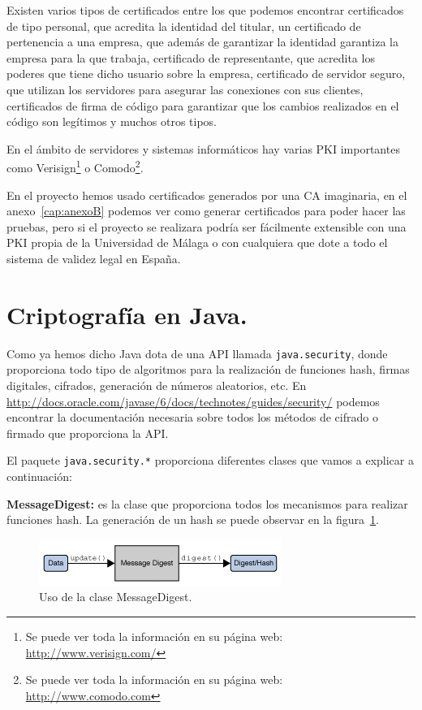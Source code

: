 Existen varios tipos de certificados entre los que podemos encontrar certificados de tipo personal, que acredita la identidad del titular, un certificado de pertenencia a una empresa, que además de garantizar la identidad garantiza la empresa para la que trabaja, certificado de representante, que acredita los poderes que tiene dicho usuario sobre la empresa, certificado de servidor seguro, que utilizan los servidores para asegurar las conexiones con sus clientes, certificados de firma de código para garantizar que los cambios realizados en el código son legítimos y muchos otros tipos.

En el ámbito de servidores y sistemas informáticos hay varias PKI importantes como Verisign\footnote{ Se puede ver toda la información en su página web: \url{http://www.verisign.com/}} o Comodo\footnote{ Se puede ver toda la información en su página web: \url{http://www.comodo.com}}.  


En el proyecto hemos usado certificados generados por una CA imaginaria, en el anexo~\ref{cap:anexoB} podemos ver como generar certificados para poder hacer las pruebas, pero si el proyecto se realizara podría ser fácilmente extensible con una PKI propia de la Universidad de Málaga o con cualquiera que dote a todo el sistema de validez legal en España.

\section{Criptografía en Java.}\label{cap:javasecurity}

Como ya hemos dicho Java dota de una API llamada \lstinline{java.security}, donde proporciona todo tipo de algoritmos para la realización de funciones hash, firmas digitales, cifrados, generación de números aleatorios, etc. En \url{http://docs.oracle.com/javase/6/docs/technotes/guides/security/} podemos encontrar la documentación necesaria sobre todos los métodos de cifrado o firmado que proporciona la API.

El paquete \lstinline{java.security.*} proporciona diferentes clases que vamos a explicar a continuación:



\textbf{MessageDigest:} es la clase que proporciona todos los mecanismos para realizar funciones hash. La generación de un hash se puede observar en la figura~\ref{fig:messageDigest}. 

\begin{figure}[h]
  \centering
    \includegraphics[scale=1.3]{./Criptografia/imagenes/messageDigest.png}
  \caption{Uso de la clase MessageDigest.}
  \label{fig:messageDigest}
\end{figure} 

